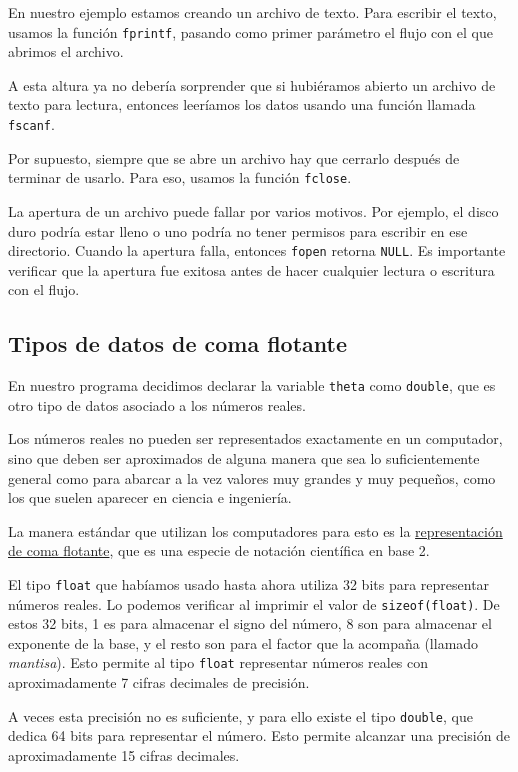 En nuestro ejemplo estamos creando un archivo de texto. Para escribir el
texto, usamos la función \lstinline!fprintf!, pasando como primer
parámetro el flujo con el que abrimos el archivo.

A esta altura ya no debería sorprender que si hubiéramos abierto un
archivo de texto para lectura, entonces leeríamos los datos usando una
función llamada \lstinline!fscanf!.

Por supuesto, siempre que se abre un archivo hay que cerrarlo después de
terminar de usarlo. Para eso, usamos la función \lstinline!fclose!.

La apertura de un archivo puede fallar por varios motivos. Por ejemplo,
el disco duro podría estar lleno o uno podría no tener permisos para
escribir en ese directorio. Cuando la apertura falla, entonces
\lstinline!fopen! retorna \lstinline!NULL!. Es importante verificar que
la apertura fue exitosa antes de hacer cualquier lectura o escritura con
el flujo.

\subsection{Tipos de datos de coma flotante}

En nuestro programa decidimos declarar la variable \lstinline!theta!
como \lstinline!double!, que es otro tipo de datos asociado a los
números reales.

Los números reales no pueden ser representados exactamente en un
computador, sino que deben ser aproximados de alguna manera que sea lo
suficientemente general como para abarcar a la vez valores muy grandes y
muy pequeños, como los que suelen aparecer en ciencia e ingeniería.

La manera estándar que utilizan los computadores para esto es la
\href{http://es.wikipedia.org/wiki/Coma\_flotante}{representación de
coma flotante}, que es una especie de notación científica en base 2.

El tipo \lstinline!float! que habíamos usado hasta ahora utiliza 32 bits
para representar números reales. Lo podemos verificar al imprimir el
valor de \lstinline!sizeof(float)!. De estos 32 bits, 1 es para
almacenar el signo del número, 8 son para almacenar el exponente de la
base, y el resto son para el factor que la acompaña (llamado
\emph{mantisa}). Esto permite al tipo \lstinline!float! representar
números reales con aproximadamente 7 cifras decimales de precisión.

A veces esta precisión no es suficiente, y para ello existe el tipo
\lstinline!double!, que dedica 64 bits para representar el número. Esto
permite alcanzar una precisión de aproximadamente 15 cifras decimales.

